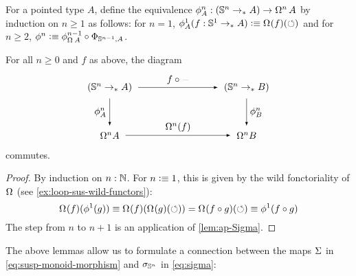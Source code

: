 \documentclass[english,a4]{article}
\newcommand{\ptdto}{\to_\ast}%
\begin{document}
For a pointed type $A$, define the equivalence $\phi_A^n: (\Sn n \ptdto A) \to
\loopspace n A$ by induction on $n\geq 1$ as follows: for $n=1$,
$\phi_A^1(f:\Sc \ptdto A) \defequi \loopspace\null (f)(\Sloop)$ and for $n\geq
2$, $\phi^n \defequi \phi_{\loopspace\null A}^{n-1} \circ \Phi_{\Sn {n-1},A}$.
\begin{corollary}\label{lem:iterated-ap-Sigma}
    For all $n \geq 0$ and $f$ as above, the diagram
    \begin{equation}
    \begin{tikzpicture}[x=5cm,y=-1.75cm,baseline=(current bounding box.center)]
    \tikzset{arrow/.style={shorten >=0.1cm,shorten <=.1cm,-latex}}
    \node (A) at (0,0) {$(\Sn n \to_* A)$}; 
    \node (D) at (1,0) {$(\Sn n \to_* B)$}; 
    \node (B) at (0,1) {$\Omega^n A$}; 
    \node (C) at (1,1) {$\Omega^n B$}; 
    
    \draw[arrow] (A) to node [above] {$f \circ \blank$} (D);
    \draw[arrow] (A) to node [left] {$\phi_A^n$} (B);
    \draw[arrow] (B) to node [above] {$\Omega^n(f)$} (C);
    \draw[arrow] (D) to node [right] {$\phi_B^n$} (C);
    \end{tikzpicture}
    \end{equation}
    commutes.
\end{corollary}
\begin{proof}
  By induction on $n:\mathbb{N}$. For $n\vcentcolon\equiv 1$, this is given by the wild fonctoriality of
  $\loopspace\null$ (see \cref{ex:loop-sus-wild-functors}):
  \begin{displaymath}
    \loopspace \null (f) (\phi^1 (g)) \jdeq \loopspace\null(f)(\loopspace\null(g)(\Sloop))
    =\loopspace\null(f\circ g)(\Sloop) \jdeq \phi^1(f\circ g)
  \end{displaymath}
  The step from $n$ to $n+1$ is an application of \cref{lem:ap-Sigma}.
\end{proof}


The above lemmas allow us to formulate a connection between the maps $\operatorname{\Sigma}$ in
\eqref{eq:susp-monoid-morphism} and $\sigma_{{\mathbb S^{n}}}$ in \eqref{eq:sigma}:
\end{document}
